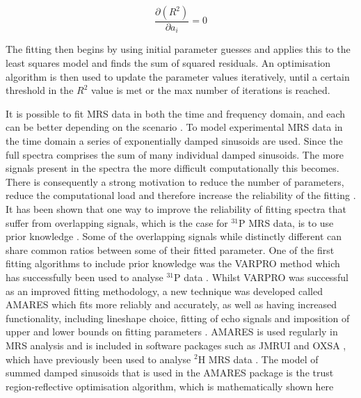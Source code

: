 \begin{equation}
    \frac{\partial (R^2)}{\partial a_i} = 0
    \label{eqn:theory:Diff}
\end{equation}

\noindent The fitting then begins by using initial parameter guesses and applies this to the least squares model and finds the sum of squared residuals. An optimisation algorithm is then used to update the parameter values iteratively, until a certain threshold in the $R^2$ value is met or the max number of iterations is reached. 

It is possible to fit MRS data in both the time and frequency domain, and each can be better depending on the scenario \cite{Poullet2008MRSMethods}. To model experimental \ac{MRS} data in the time domain a series of exponentially damped sinusoids are used. Since the full spectra comprises the sum of many individual damped sinusoids. The more signals present in the spectra the more difficult computationally this becomes. There is consequently a strong motivation to reduce the number of parameters, reduce the computational load and therefore increase the reliability of the fitting \cite{Near2021PreprocessingRecommendations}. It has been shown that one way to improve the reliability of fitting spectra that suffer from overlapping signals, which is the case for $^{31}$P \ac{MRS} data, is to use prior knowledge \cite{Hamilton2003PriorSpectra}. Some of the overlapping signals while distinctly different can share common ratios between some of their fitted parameter. One of the first fitting algorithms to include prior knowledge was the \ac{VARPRO} method \cite{Golub1973TheSeparate} which has successfully been used to analyse $^{31}$P data \cite{vanderVeen1988AccurateKnowledge,Stubbs199631P-MagneticADP}. Whilst \ac{VARPRO} was successful as an improved fitting methodology, a new technique was developed called \ac{AMARES} which fits more reliably and accurately, as well as having increased functionality, including lineshape choice, fitting of echo signals and imposition of upper and lower bounds on fitting parameters \cite{Vanhamme1997ImprovedKnowledge}. \ac{AMARES} is used regularly in \ac{MRS} analysis and is included in software packages such as JMRUI \cite{Stefan2009QuantitationPackage} and OXSA \cite{Purvis2017OXSA:MATLAB}, which have previously been used to analyse $^2$H \ac{MRS} data \cite{Simoes2022GlucoseGlioblastoma,Kreis2020MeasuringMRI,Kaggie2022DeuteriumMetabolism}. The model of summed damped sinusoids that is used in the \ac{AMARES} package is the trust region-reflective optimisation algorithm, which is mathematically shown here

